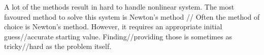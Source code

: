 A lot of the methods result in hard to handle nonlinear system. The most favoured method to solve this system is Newton's method // Often the method of choice is Newton's method. However, it requires an appropriate initial guess//accurate starting value. Finding//providing those is sometimes as tricky//hard as the problem itself.
